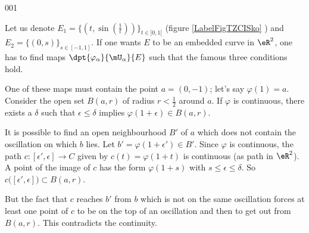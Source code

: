 \begin{corrige}{001}
 
    Let us denote $E_1=\{(t,\sin(\frac{1}{t}))\}_{t\in]0,1[}$ (figure \ref{LabelFigTZCISko} ) and $E_2=\{(0,s)\}_{s\in[-1,1]}$. 
If one wants $E$ to be an embedded curve in $\eR^2$, one has to find maps $\dpt{ \varphi_{\alpha} }{ \mU_{\alpha} }{ E }$ such that the famous three conditions hold.

\newcommand{\CaptionFigTZCISko}{The graph of the function \( x\mapsto \sin(1/x).\)}


One of these maps must contain the point $a=(0,-1)$; let's say $\varphi(1)=a$. Consider the open set $B(a,r)$ of radius $r<\frac{ 1 }{2}$ around $a$. If $\varphi$ is continuous, there exists a $\delta$ such that $\epsilon\leq\delta$ implies $\varphi(1+\epsilon)\in B(a,r)$. 

It is possible to find an open neighbourhood $B'$ of $a$ which does not contain the oscillation on which $b$ lies. Let $b'=\varphi(1+\epsilon')\in B'$. Since $\varphi$ is continuous, the path $c\colon [\epsilon',\epsilon]\to C$ given by $c(t)=\varphi(1+t)$ is continuous (as path in $\eR^2$). A point of the image of $c$ has the form $\varphi(1+s)$ with $s\leq\epsilon\leq\delta$. So $c\big( [\epsilon',\epsilon] \big)\subset B(a,r)$.

But the fact that $c$ reaches $b'$ from $b$ which is not on the same oscillation forces at least one point of $c$ to be on the top of an oscillation and then to get out from $B(a,r)$. This contradicts the continuity.

\end{corrige}
